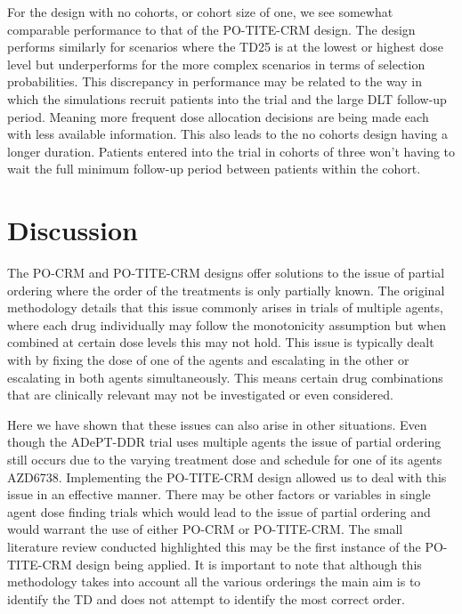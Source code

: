 For the design with no cohorts, or cohort size of one, we see somewhat comparable performance to that of the PO-TITE-CRM design. The design performs similarly for scenarios where the TD25 is at the lowest or highest dose level but underperforms for the more complex scenarios in terms of selection probabilities. This discrepancy in performance may be related to the way in which the simulations recruit patients into the trial and the large DLT follow-up period. Meaning more frequent dose allocation decisions are being made each with less available information. This also leads to the no cohorts design having a longer duration. Patients entered into the trial in cohorts of three won't having to wait the full minimum follow-up period between patients within the cohort.




\section{Discussion}  
\label{section2.5}%

The PO-CRM and PO-TITE-CRM designs offer solutions to the issue of partial ordering where the order of the treatments is only partially known. The original methodology details that this issue commonly arises in trials of multiple agents, where each drug individually may follow the monotonicity assumption but when combined at certain dose levels this may not hold. This issue is typically dealt with by fixing the dose of one of the agents and escalating in the other or escalating in both agents simultaneously. This means certain drug combinations that are clinically relevant may not be investigated or even considered.  
 
Here we have shown that these issues can also arise in other situations. Even though the ADePT-DDR trial uses multiple agents the issue of partial ordering still occurs due to the varying treatment dose and schedule for one of its agents AZD6738. Implementing the PO-TITE-CRM design allowed us to deal with this issue in an effective manner. There may be other factors or variables in single agent dose finding trials which would lead to the issue of partial ordering and would warrant the use of either PO-CRM or PO-TITE-CRM. The small literature review conducted highlighted this may be the first instance of the PO-TITE-CRM design being applied. It is important to note that although this methodology takes into account all the various orderings the main aim is to identify the TD and does not attempt to identify the most correct order. 

